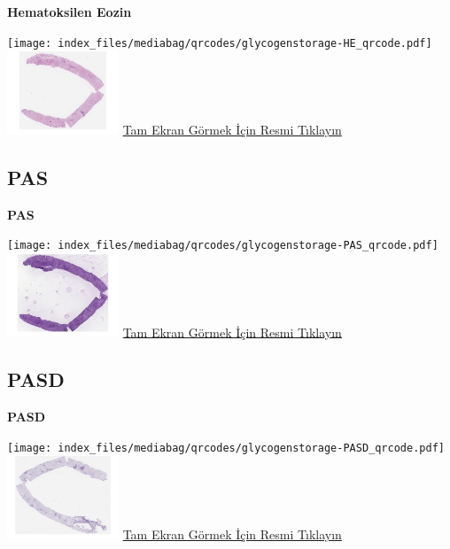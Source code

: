 \documentclass[
  letterpaper,
  DIV=11,
  numbers=noendperiod]{scrreprt}
\begin{document}
\textbf{Hematoksilen Eozin}

\texttt{[image: index\_files/mediabag/qrcodes/glycogenstorage-HE\_qrcode.pdf]}
\href{https://images.patolojiatlasi.com/glycogenstorage/HE.html}{\includegraphics[width=0.25\textwidth,height=\textheight]{./screenshots/thumbnail_glycogenstorage-HE.png}}
\href{https://images.patolojiatlasi.com/glycogenstorage/HE.html}{Tam
Ekran Görmek İçin Resmi Tıklayın}

\hypertarget{pas}{%
\subsection{PAS}\label{pas}}

\textbf{PAS}

\texttt{[image: index\_files/mediabag/qrcodes/glycogenstorage-PAS\_qrcode.pdf]}
\href{https://images.patolojiatlasi.com/glycogenstorage/PAS.html}{\includegraphics[width=0.25\textwidth,height=\textheight]{./screenshots/thumbnail_glycogenstorage-PAS.png}}
\href{https://images.patolojiatlasi.com/glycogenstorage/PAS.html}{Tam
Ekran Görmek İçin Resmi Tıklayın}

\hypertarget{pasd}{%
\subsection{PASD}\label{pasd}}

\textbf{PASD}

\texttt{[image: index\_files/mediabag/qrcodes/glycogenstorage-PASD\_qrcode.pdf]}
\href{https://images.patolojiatlasi.com/glycogenstorage/PASD.html}{\includegraphics[width=0.25\textwidth,height=\textheight]{./screenshots/thumbnail_glycogenstorage-PASD.png}}
\href{https://images.patolojiatlasi.com/glycogenstorage/PASD.html}{Tam
Ekran Görmek İçin Resmi Tıklayın}
\end{document}
